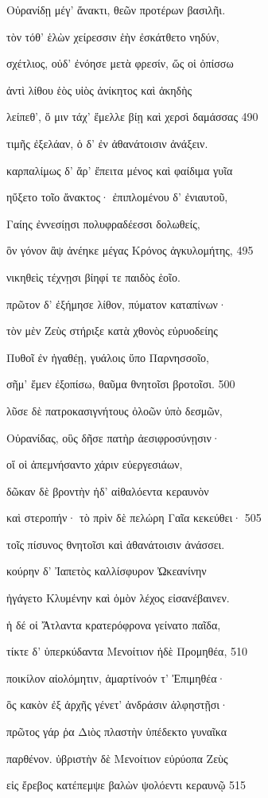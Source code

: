 Οὐρανίδῃ μέγ' ἄνακτι, θεῶν προτέρων βασιλῆι.

τὸν τόθ' ἑλὼν χείρεσσιν ἑὴν ἐσκάτθετο νηδύν, 

σχέτλιος, οὐδ' ἐνόησε μετὰ φρεσίν, ὥς οἱ ὀπίσσω 

ἀντὶ λίθου ἑὸς υἱὸς ἀνίκητος καὶ ἀκηδὴς

λείπεθ', ὅ μιν τάχ' ἔμελλε βίῃ καὶ χερσὶ δαμάσσας \num{490}

τιμῆς ἐξελάαν, ὁ δ' ἐν ἀθανάτοισιν ἀνάξειν. 

καρπαλίμως δ' ἄρ' ἔπειτα μένος καὶ φαίδιμα γυῖα

ηὔξετο τοῖο ἄνακτος· ἐπιπλομένου δ' ἐνιαυτοῦ, 

Γαίης ἐννεσίῃσι πολυφραδέεσσι δολωθείς, 

ὃν γόνον ἂψ ἀνέηκε μέγας Κρόνος ἀγκυλομήτης, \num{495} 

νικηθεὶς τέχνῃσι βίηφί τε παιδὸς ἑοῖο.

πρῶτον δ' ἐξήμησε λίθον, πύματον καταπίνων·

τὸν μὲν Ζεὺς στήριξε κατὰ χθονὸς εὐρυοδείης

Πυθοῖ ἐν ἠγαθέῃ, γυάλοις ὕπο Παρνησσοῖο, 

σῆμ' ἔμεν ἐξοπίσω, θαῦμα θνητοῖσι βροτοῖσι. \num{500} 

λῦσε δὲ πατροκασιγνήτους ὀλοῶν ὑπὸ δεσμῶν, 

Οὐρανίδας, οὓς δῆσε πατὴρ ἀεσιφροσύνῃσιν· 

οἵ οἱ ἀπεμνήσαντο χάριν εὐεργεσιάων,

δῶκαν δὲ βροντὴν ἠδ' αἰθαλόεντα κεραυνὸν

καὶ στεροπήν· τὸ πρὶν δὲ πελώρη Γαῖα κεκεύθει· \num{505} 

τοῖς πίσυνος θνητοῖσι καὶ ἀθανάτοισιν ἀνάσσει.

κούρην δ' Ἰαπετὸς καλλίσφυρον Ὠκεανίνην

ἠγάγετο Κλυμένην καὶ ὁμὸν λέχος εἰσανέβαινεν.

ἡ δέ οἱ Ἄτλαντα κρατερόφρονα γείνατο παῖδα,

τίκτε δ' ὑπερκύδαντα Μενοίτιον ἠδὲ Προμηθέα, \num{510}

ποικίλον αἰολόμητιν, ἁμαρτίνοόν τ' Ἐπιμηθέα· 

ὃς κακὸν ἐξ ἀρχῆς γένετ' ἀνδράσιν ἀλφηστῇσι· 

πρῶτος γάρ ῥα Διὸς πλαστὴν ὑπέδεκτο γυναῖκα

παρθένον. ὑβριστὴν δὲ Μενοίτιον εὐρύοπα Ζεὺς

εἰς ἔρεβος κατέπεμψε βαλὼν ψολόεντι κεραυνῷ \num{515} 

